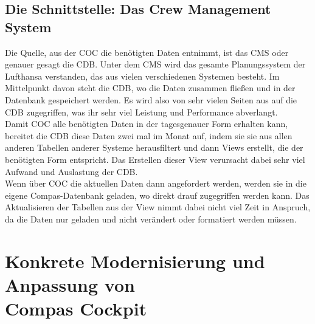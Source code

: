 \documentclass [12pt, a4paper, oneside, titlepage, ngerman]{article}
\begin{document}
\subsection {Die Schnittstelle: Das Crew Management System}
Die Quelle, aus der \ac{COC} die benötigten Daten entnimmt, ist das \ac{CMS} oder genauer gesagt die \ac{CDB}. Unter dem \ac{CMS} wird das gesamte Planungssystem der Lufthansa verstanden, das aus vielen verschiedenen Systemen besteht. Im Mittelpunkt davon steht die \ac{CDB}, wo die Daten zusammen fließen und in der Datenbank gespeichert werden. Es wird also von sehr vielen Seiten aus auf die \ac{CDB} zugegriffen, was ihr sehr viel Leistung und Performance abverlangt. \\
Damit \ac{COC} alle benötigten Daten in der tagesgenauer Form erhalten kann, bereitet die \ac{CDB} diese Daten zwei mal im Monat auf, indem sie sie aus allen anderen Tabellen anderer Systeme herausfiltert und dann Views erstellt, die der benötigten Form entspricht. Das Erstellen dieser View verursacht dabei sehr viel Aufwand und Auslastung der \ac{CDB}.\\
Wenn über \ac{COC} die aktuellen Daten dann angefordert werden, werden sie in die eigene Compas-Datenbank geladen, wo direkt drauf zugegriffen werden kann. Das Aktualisieren der Tabellen aus der View nimmt dabei nicht viel Zeit in Anspruch, da die Daten nur geladen und nicht verändert oder formatiert werden müssen.


\section [Konkrete Modernisierung und Anpassung von Compas Cockpit]{Konkrete Modernisierung und Anpassung von \\ Compas Cockpit}
\end{document}
